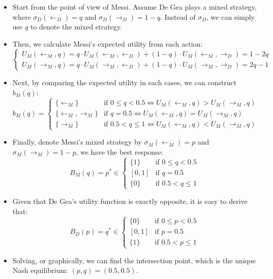 \documentclass[notitlepage]{article}
\begin{document}
\begin{itemize}
    \begin{itemize}
        \item Start from the point of view of Messi. Assume De Gea plays a mixed strategy, where \(\sigma_D(\leftarrow_D) = q\) and \(\sigma_D(\rightarrow_D) = 1-q\). Instead of \(\sigma_D\), we can simply use \(q\) to denote the mixed strategy.
        \item Then, we calculate Messi's expected utility from each action:
        \[
        \begin{cases}
            U_M(\leftarrow_M, q) = q \cdot U_M(\leftarrow_M, \leftarrow_D) + (1-q) \cdot U_M(\leftarrow_M, \rightarrow_D) = 1-2q \\
            U_M(\rightarrow_M, q) = q \cdot U_M(\rightarrow_M, \leftarrow_D) + (1-q) \cdot U_M(\rightarrow_M, \rightarrow_D) = 2q-1
        \end{cases}
        \]
        \item Next, by comparing the expected utility in each cases, we can construct \(b_M(q)\):
        \[
        b_M(q) =
        \begin{cases}
            \{\leftarrow_M\} & \text{if } 0 \le q < 0.5 \iff U_M(\leftarrow_M, q) > U_M(\rightarrow_M, q) \\
            \{\leftarrow_M, \rightarrow_M\} & \text{if } q = 0.5 \iff U_M(\leftarrow_M, q) = U_M(\rightarrow_M, q) \\
            \{\rightarrow_M\} & \text{if } 0.5 < q \le 1 \iff U_M(\leftarrow_M, q) < U_M(\rightarrow_M, q)
        \end{cases}
        \]
        \item Finally, denote Messi's mixed strategy by \(\sigma_M(\leftarrow_M) = p\) and \(\sigma_M(\rightarrow_M) = 1-p\), we have the best response:
        \[
        B_M(q) = p^* \in
        \begin{cases}
            \{1\} &\text{if } 0 \le q < 0.5 \\
            [0,1] &\text{if } q = 0.5 \\
            \{0\} &\text{if } 0.5 < q \le 1
        \end{cases}
        \]
        \item Given that De Gea's utility function is exactly opposite, it is easy to derive that:
        \[
        B_D(p) = q^* \in
        \begin{cases}
            \{0\} &\text{if } 0 \le p < 0.5 \\
            [0,1] &\text{if } p = 0.5 \\
            \{1\} &\text{if } 0.5 < p \le 1
        \end{cases}
        \]
        \item Solving, or graphically, we can find the intersection point, which is the unique Nash equilibrium: \((p,q) = (0.5, 0.5)\).
    \end{itemize}


\end{itemize}
\end{document}
